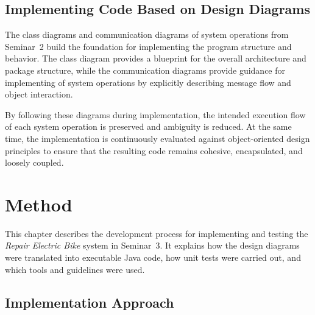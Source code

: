 \documentclass[a4paper]{scrartcl}
\begin{document}
\subsection{Implementing Code Based on Design Diagrams}

The class diagrams and communication diagrams of system operations from Seminar~2 build the foundation for implementing the program structure and behavior. The class diagram provides a blueprint for the overall architecture and package structure, while the communication diagrams provide guidance for implementing of system operations by explicitly describing message flow and object interaction.

By following these diagrams during implementation, the intended execution flow of each system operation is preserved and ambiguity is reduced. At the same time, the implementation is continuously evaluated against object-oriented design principles to ensure that the resulting code remains cohesive, encapsulated, and loosely coupled.

\section{Method}



This chapter describes the development process for implementing and testing the \textit{Repair Electric Bike} system in Seminar~3. It explains how the design diagrams were translated into executable Java code, how unit tests were carried out, and which tools and guidelines were used.

\subsection{Implementation Approach}
\end{document}
